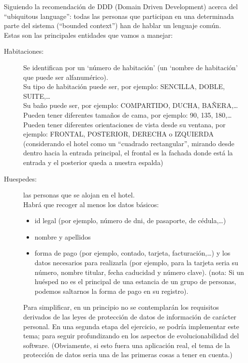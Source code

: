 \documentclass[spanish,12pt,a4paper,final,oneside]{book}
\begin{document}
\vspace{0.5cm}

Siguiendo la recomendación de DDD (Domain Driven Development) acerca del ``ubiquitous language'': todas las personas que participan en una determinada parte del sistema (``bounded context'') han de hablar un lenguaje común.
\\Estas son las principales entidades que vamos a manejar:

\begin{description}


\item[Habitaciones:] Se identifican por un `número de habitación' (un `nombre de habitación' que puede ser alfanumérico).
\\Su tipo de habitación puede ser, por ejemplo: SENCILLA, DOBLE, SUITE,\ldots
\\Su baño puede ser, por ejemplo:  COMPARTIDO, DUCHA, BAÑERA,\ldots
\\Pueden tener diferentes tamaños de cama, por ejemplo: 90, 135, 180,\ldots
\\Pueden tener diferentes orientaciones de vista desde su ventana, por ejemplo: FRONTAL, POSTERIOR, DERECHA o IZQUIERDA (considerando el hotel como un ``cuadrado rectangular'', mirando desde dentro hacia la entrada principal, el frontal es la fachada donde está la entrada y el posterior queda a nuestra espalda)

\item[Huespedes:] las personas que se alojan en el hotel.
\\Habrá que recoger al menos los datos básicos:
\begin{itemize}
\item id legal (por ejemplo, número de dni, de pasaporte, de cédula,\ldots)
\item nombre y apellidos
\item forma de pago (por ejemplo, contado, tarjeta, facturación,\ldots) y los datos necesarios para realizarla (por ejemplo, para la tarjeta seria su número, nombre titular, fecha caducidad y número clave).  (nota: Si un huésped no es el principal de una estancia de un grupo de personas, podemos saltarnos la forma de pago en su registro).
\end{itemize}

Para simplificar, en un principio no se contemplarán los requisitos derivados de las leyes de protección de datos de información de carácter personal.  En una segunda etapa del ejercicio, se podría implementar este tema; para seguir profundizando en los aspectos de evolucionabilidad del software.
(Obviamente, si esto fuera una aplicación real, el tema de la protección de datos seria una de las primeras cosas a tener en cuenta.)


\end{description}
\end{document}
